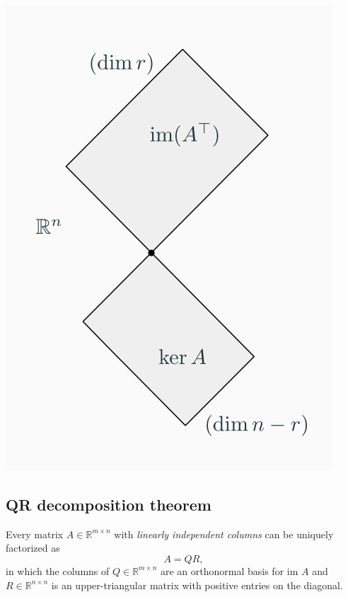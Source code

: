 \documentclass[10pt]{report}
\begin{document}
\begin{center}
\includegraphics[scale=0.3]{./pics/alg/orthogonal-complements.jpg}
\end{center}

\subsection{QR decomposition theorem}
\label{sec:org2056a2a}
Every matrix \(A \in \mathbb{R}^{m \times n}\) with \emph{linearly independent columns} can be uniquely factorized as $$A = QR,$$ in which the columns of \(Q \in \mathbb{R}^{m \times n}\) are an orthonormal basis for \(\mbox{im }A\) and \(R\in\mathbb{R}^{n \times n}\) is an upper\--triangular matrix with positive entries on the diagonal.
\end{document}
